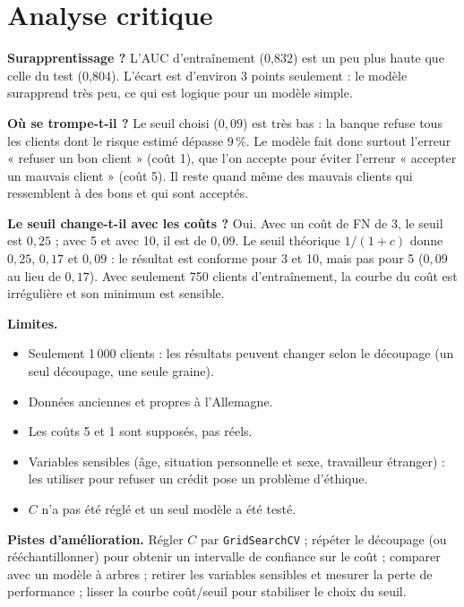 \documentclass[11pt,a4paper]{article}
\begin{document}
\section{Analyse critique}
\textbf{Surapprentissage ?} L'AUC d'entraînement (0,832) est un peu plus haute que celle du test (0,804). L'écart est d'environ 3 points seulement : le modèle surapprend très peu, ce qui est logique pour un modèle simple.

\textbf{Où se trompe-t-il ?} Le seuil choisi ($0{,}09$) est très bas : la banque refuse tous les clients dont le risque estimé dépasse 9\,\%. Le modèle fait donc surtout l'erreur « refuser un bon client » (coût 1), que l'on accepte pour éviter l'erreur « accepter un mauvais client » (coût 5). Il reste quand même des mauvais clients qui ressemblent à des bons et qui sont acceptés.

\textbf{Le seuil change-t-il avec les coûts ?} Oui. Avec un coût de FN de 3, le seuil est $0{,}25$ ; avec 5 et avec 10, il est de $0{,}09$. Le seuil théorique $1/(1+c)$ donne $0{,}25$, $0{,}17$ et $0{,}09$ : le résultat est conforme pour 3 et 10, mais pas pour 5 ($0{,}09$ au lieu de $0{,}17$). Avec seulement 750 clients d'entraînement, la courbe du coût est irrégulière et son minimum est sensible.

\textbf{Limites.}
\begin{itemize}[nosep]
  \item Seulement 1\,000 clients : les résultats peuvent changer selon le découpage (un seul découpage, une seule graine).
  \item Données anciennes et propres à l'Allemagne.
  \item Les coûts 5 et 1 sont supposés, pas réels.
  \item Variables sensibles (âge, situation personnelle et sexe, travailleur étranger) : les utiliser pour refuser un crédit pose un problème d'éthique.
  \item $C$ n'a pas été réglé et un seul modèle a été testé.
\end{itemize}

\textbf{Pistes d'amélioration.} Régler $C$ par \texttt{GridSearchCV} ; répéter le découpage (ou rééchantillonner) pour obtenir un intervalle de confiance sur le coût ; comparer avec un modèle à arbres ; retirer les variables sensibles et mesurer la perte de performance ; lisser la courbe coût/seuil pour stabiliser le choix du seuil.
\end{document}

